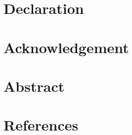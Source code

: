 \documentclass[a4paper,11pt]{report}
\begin{document}
\maketitle
\newpage

\chapter*{Declaration}

\chapter*{Acknowledgement}

\chapter*{Abstract}

\tableofcontents


\listoffigures
\listoftables



\chapter{References}
\printbibliography

\printglossaries
\end{document}
